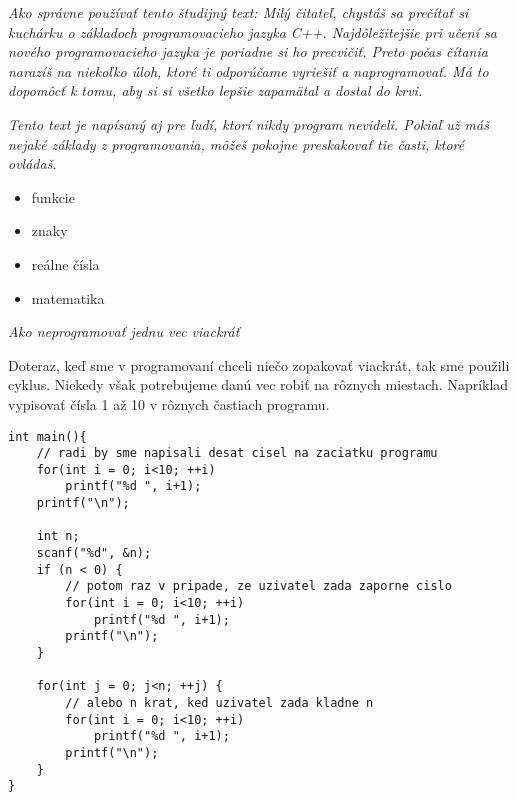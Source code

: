 




\textit{Ako správne používať tento študijný text: Milý čitateľ, chystáš sa
prečítať si kuchárku o základoch programovacieho jazyka C++. Najdôležitejšie
pri učení sa nového programovacieho jazyka je poriadne si ho precvičiť. Preto
počas čítania narazíš na niekoľko úloh, ktoré ti odporúčame vyriešiť a
naprogramovať.  Má to dopomôcť k tomu, aby si si všetko lepšie zapamätal a dostal
do krvi.}

\textit{Tento text je napísaný aj pre ľudí, ktorí nikdy program nevideli. Pokiaľ
už máš nejaké základy z programovania, môžeš pokojne preskakovať tie časti,
ktoré ovládaš.}

\begin{itemize}
    \vspace{-8pt}
    \item funkcie
    \vspace{-5pt}
    \item znaky
    \vspace{-5pt}
    \item reálne čísla
    \vspace{-5pt}
    \item matematika
\end{itemize}

\medskip


\textit{Ako neprogramovať jednu vec viackráť}

Doteraz, keď sme v programovaní chceli niečo zopakovať viackrát, tak
sme použili cyklus. Niekedy však potrebujeme danú vec robiť na rôznych miestach.
Napríklad vypisovať čísla 1 až 10 v rôznych častiach programu.

\begin{lstlisting}
int main(){
    // radi by sme napisali desat cisel na zaciatku programu
    for(int i = 0; i<10; ++i)
        printf("%d ", i+1);
    printf("\n");

    int n;
    scanf("%d", &n);
    if (n < 0) {
        // potom raz v pripade, ze uzivatel zada zaporne cislo
        for(int i = 0; i<10; ++i)
            printf("%d ", i+1);
        printf("\n");
    }

    for(int j = 0; j<n; ++j) {
        // alebo n krat, ked uzivatel zada kladne n
        for(int i = 0; i<10; ++i)
            printf("%d ", i+1);
        printf("\n");        
    }
}
\end{lstlisting}

